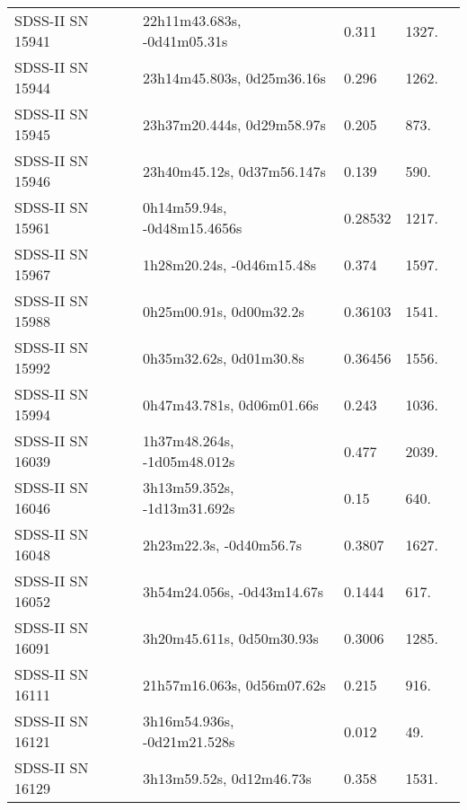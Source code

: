 \begin{longtable}{lllll}
 SDSS-II SN 15941 &    22h11m43.683s, -0d41m05.31s &    0.311 &          1327. &    \citet{2011ApJ...738..162S} \\
 SDSS-II SN 15944 &     23h14m45.803s, 0d25m36.16s &    0.296 &          1262. &    \citet{2011ApJ...738..162S} \\
 SDSS-II SN 15945 &     23h37m20.444s, 0d29m58.97s &    0.205 &           873. &    \citet{2011ApJ...738..162S} \\
 SDSS-II SN 15946 &     23h40m45.12s, 0d37m56.147s &    0.139 &           590. &    \citet{2011ApJ...738..162S} \\
 SDSS-II SN 15961 &    0h14m59.94s, -0d48m15.4656s &  0.28532 &          1217. &    \citet{2016SDSSD.C...0000:} \\
 SDSS-II SN 15967 &      1h28m20.24s, -0d46m15.48s &    0.374 &          1597. &    \citet{2011ApJ...738..162S} \\
 SDSS-II SN 15988 &        0h25m00.91s, 0d00m32.2s &  0.36103 &          1541. &    \citet{2016SDSSD.C...0000:} \\
 SDSS-II SN 15992 &        0h35m32.62s, 0d01m30.8s &  0.36456 &          1556. &    \citet{2016SDSSD.C...0000:} \\
 SDSS-II SN 15994 &      0h47m43.781s, 0d06m01.66s &    0.243 &          1036. &    \citet{2010ApJ...713.1026D} \\
 SDSS-II SN 16039 &    1h37m48.264s, -1d05m48.012s &    0.477 &          2039. &    \citet{2011ApJ...738..162S} \\
 SDSS-II SN 16046 &    3h13m59.352s, -1d13m31.692s &     0.15 &           640. &    \citet{2011ApJ...738..162S} \\
 SDSS-II SN 16048 &        2h23m22.3s, -0d40m56.7s &   0.3807 &          1627. &    \citet{2016SDSSD.C...0000:} \\
 SDSS-II SN 16052 &     3h54m24.056s, -0d43m14.67s &   0.1444 &           617. &    \citet{2011ApJ...738..162S} \\
 SDSS-II SN 16091 &      3h20m45.611s, 0d50m30.93s &   0.3006 &          1285. &    \citet{2011ApJ...738..162S} \\
 SDSS-II SN 16111 &     21h57m16.063s, 0d56m07.62s &    0.215 &           916. &    \citet{2011ApJ...738..162S} \\
 SDSS-II SN 16121 &    3h16m54.936s, -0d21m21.528s &    0.012 &            49. &    \citet{2011ApJ...738..162S} \\
 SDSS-II SN 16129 &       3h13m59.52s, 0d12m46.73s &    0.358 &          1531. &    \citet{2011ApJ...738..162S} \\

\end{longtable}

